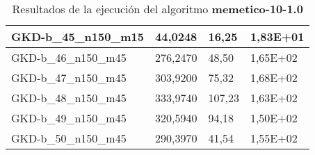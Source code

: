 \begin{table}[!ht]
\begin{adjustbox}{height=12cm}
\begin{tabular}{|l|l|l|l|}
		GKD-b\_45\_n150\_m15 & 44,0248  & 16,25          & 1,83E+01 \\ \hline
		GKD-b\_46\_n150\_m45 & 276,2470 & 48,50          & 1,65E+02 \\ \hline
		GKD-b\_47\_n150\_m45 & 303,9200 & 75,32          & 1,68E+02 \\ \hline
		GKD-b\_48\_n150\_m45 & 333,9740 & 107,23         & 1,63E+02 \\ \hline
		GKD-b\_49\_n150\_m45 & 320,5940 & 94,18          & 1,50E+02 \\ \hline
		GKD-b\_50\_n150\_m45 & 290,3970 & 41,54          & 1,55E+02 \\ \hline
    \end{tabular}
    \end{adjustbox}
    \caption{Resultados de la ejecución del algoritmo \textbf{memetico-10-1.0}}
\end{table}

\pagebreak